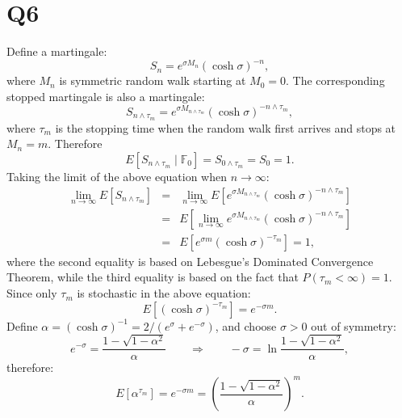 \documentclass[final,3p,times]{elsarticle}
\begin{document}
\section{Q6}
	Define a martingale:
	\begin{equation}
		S_n = e^{\sigma M_n} \left( \cosh{\sigma} \right)^{-n}
		,
	\end{equation}
	where $M_n$ is symmetric random walk starting at $M_0 = 0$. The corresponding stopped martingale is also a martingale:
	\begin{equation}
		S_{n \wedge \tau_m} = e^{\sigma M_{n \wedge \tau_m}} \left( \cosh{\sigma} \right)^{-{n \wedge \tau_m}}
		,
	\end{equation}
	where $\tau_m$ is the stopping time when the random walk first arrives and stops at $M_n = m$. Therefore
	\begin{equation}
		E[S_{n \wedge \tau_m} \mid \mathbb{F}_0] = S_{0 \wedge \tau_m} = S_0 = 1
		.
	\end{equation}
	Taking the limit of the above equation when $n \to \infty$:
	\begin{eqnarray}
		\lim_{n \to \infty} E[S_{n \wedge \tau_m}]
		&=&
		\lim_{n \to \infty} E[e^{\sigma M_{n \wedge \tau_m}} \left( \cosh{\sigma} \right)^{-{n \wedge \tau_m}}]
		\nonumber\\
		&=&
		E[\lim_{n \to \infty} e^{\sigma M_{n \wedge \tau_m}} \left( \cosh{\sigma} \right)^{-{n \wedge \tau_m}}]
		\nonumber\\
		&=&
		E[e^{\sigma m} \left( \cosh{\sigma} \right)^{-\tau_m}]
		=1
		,
	\end{eqnarray}
	where the second equality is based on Lebesgue's Dominated Convergence Theorem, while the third equality is based on the fact that $P(\tau_m < \infty)=1$. Since only $\tau_m$ is stochastic in the above equation:
	\begin{equation}
		E[\left( \cosh{\sigma} \right)^{-\tau_m}] = e^{-\sigma m}
		.
	\end{equation}
	Define $\alpha = \left( \cosh{\sigma} \right)^{-1} = 2/\left( e^{\sigma} + e^{-\sigma} \right)$, and choose $\sigma>0$ out of symmetry:
	\begin{equation}
		e^{-\sigma} = \frac{1-\sqrt{1-\alpha^2}}{\alpha}
		\qquad\Rightarrow\qquad
		-\sigma = \ln{ \frac{1-\sqrt{1-\alpha^2}}{\alpha} }
		,
	\end{equation}
	therefore:
	\begin{equation}
		\label{eqn:MomentGenFunc1}
		E[\alpha^{\tau_m}] = e^{-\sigma m} = \left( \frac{1-\sqrt{1-\alpha^2}}{\alpha} \right)^m
		.
	\end{equation}
\end{document}

